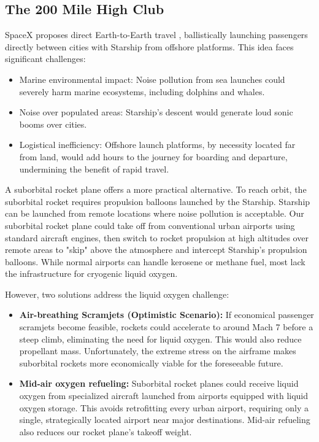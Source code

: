 \documentclass{article}
\begin{document}
{\subsection{The 200 Mile High Club} \label{sec:200_mile_high}
SpaceX proposes direct Earth-to-Earth travel \cite{earth_to_earth}, ballistically launching passengers directly between cities with Starship from offshore platforms. This idea faces significant challenges:
\begin{itemize}
\item Marine environmental impact: Noise pollution from sea launches could severely harm marine ecosystems, including dolphins and whales.
\item Noise over populated areas: Starship's descent would generate loud sonic booms over cities.
\item Logistical inefficiency: Offshore launch platforms, by necessity located far from land, would add hours to the journey for boarding and departure, undermining the benefit of rapid travel.
\end{itemize}
A suborbital rocket plane offers a more practical alternative. To reach orbit, the suborbital rocket requires propulsion balloons launched by the Starship.   Starship can be launched from remote locations where noise pollution is acceptable.  Our suborbital rocket plane could take off from conventional urban airports using standard aircraft engines, then switch to rocket propulsion at high altitudes over remote areas to "skip" above the atmosphere and intercept Starship's propulsion balloons.   While normal airports can handle kerosene or methane fuel, most lack the infrastructure for cryogenic liquid oxygen.

However, two solutions address the liquid oxygen challenge:
\begin{itemize}
\item \textbf{Air-breathing Scramjets (Optimistic Scenario):} If economical passenger scramjets become feasible, rockets could accelerate to around Mach 7 before a steep climb, eliminating the need for liquid oxygen. This would also reduce propellant mass. Unfortunately, the extreme stress on the airframe makes suborbital rockets more economically viable for the foreseeable future.
\item \textbf{Mid-air oxygen refueling:} Suborbital rocket planes could receive liquid oxygen from specialized aircraft launched from airports equipped with liquid oxygen storage. This avoids retrofitting every urban airport, requiring only a single, strategically located airport near major destinations.   Mid-air refueling also reduces our rocket plane's takeoff weight.
\end{itemize}

}
\end{document}
